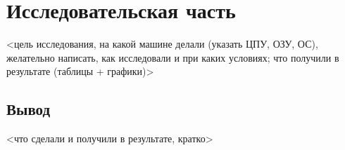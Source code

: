 \chapter{Исследовательская часть}

<цель исследования, на какой машине делали (указать ЦПУ, ОЗУ, ОС), желательно написать, как исследовали и при каких условиях; что получили в результате (таблицы + графики)>

\section{Вывод}

<что сделали и получили в результате, кратко>

\clearpage
